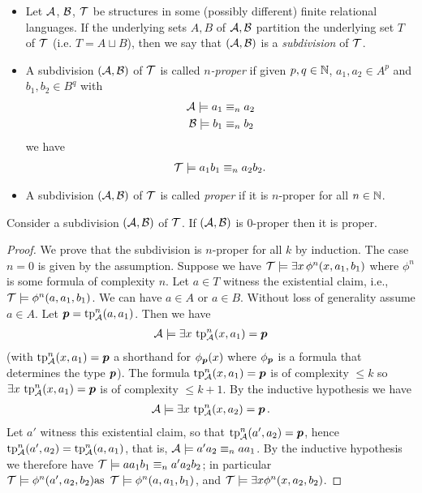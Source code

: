 \begin{Definition}
  \begin{itemize}
  \item Let $\mathcal A$, $\mathcal B$, $\operatorname{\mathcal T}$ be structures in some (possibly different) finite relational languages. If the underlying sets $A, B$ of $\mathcal A, \mathcal B$ partition the underlying set $T$ of $\operatorname{\mathcal T}$ (i.e. $T = A \sqcup B$), then we say that $(\mathcal A, \mathcal B)$ is a \emph{subdivision} of $\operatorname{\mathcal T}$.
  \item A subdivision $(\mathcal A, \mathcal B)$ of $\operatorname{\mathcal T}$ is called \emph{$n$-proper} if given $p,q \in \mathbb{N}$,  $a_1, a_2 \in A^p$ and $b_1, b_2 \in B^q$ with
    \begin{align*}
      \mathcal A \models a_1 &\equiv_n a_2 \\
      \mathcal B \models b_1 &\equiv_n b_2
    \end{align*}
    we have
    \begin{align*}
      \operatorname{\mathcal T} \models a_1b_1 \equiv_n a_2b_2.
    \end{align*}
  \item A subdivision $(\mathcal A, \mathcal B)$ of $\operatorname{\mathcal T}$ is called \emph{proper} if it is $n$-proper for all $n \in \mathbb{N}$.
  \end{itemize}
\end{Definition}

\begin{Lemma} \label{lm_subdivision}
  Consider a subdivision $(\mathcal A, \mathcal B)$ of $\operatorname{\mathcal T}$. If $(\mathcal A, \mathcal B)$ is $0$-proper then it is proper.
\end{Lemma}

\begin{proof}
  We prove that the subdivision is $n$-proper for all $k$ by induction.
  The case $n = 0$ is given by the assumption.
  Suppose we have $\operatorname{\mathcal T} \models \exists x \, \phi^n(x, a_1, b_1)$ where $\phi^n$ is some formula of complexity $n$. Let $a \in T$ witness the existential claim, i.e., $\operatorname{\mathcal T} \models \phi^n(a, a_1, b_1)$. We can have $a \in A$ or $a \in B$. Without loss of generality assume $a \in A$. Let $\operatorname{\boldsymbol p} = \operatorname{tp}^n_{\mathcal A} (a, a_1)$. Then we have 
  \begin{align*}
    \mathcal A \models \exists x \, \operatorname{tp}^n_{\mathcal A}(x, a_1) = \operatorname{\boldsymbol p}
  \end{align*}
  (with $\operatorname{tp}^n_{\mathcal A}(x, a_1) = \operatorname{\boldsymbol p}$ a shorthand for $\phi_{\operatorname{\boldsymbol p}}(x)$ where $\phi_{\operatorname{\boldsymbol p}}$ is a formula that determines the type $\operatorname{\boldsymbol p}$).
  The formula $\operatorname{tp}^n_{\mathcal A}(x, a_1) = \operatorname{\boldsymbol p}$ is of complexity $\leq k$ so $\exists x \, \operatorname{tp}^n_{\mathcal A}(x, a_1) = \operatorname{\boldsymbol p}$ is of complexity $\leq k+1$. By the inductive hypothesis we have
  \begin{align*}
    \mathcal A \models \exists x \, \operatorname{tp}^n_{\mathcal A}(x, a_2) = \operatorname{\boldsymbol p}.
  \end{align*}
  Let $a'$ witness this existential claim, so that $\operatorname{tp}^n_{\mathcal A}(a', a_2) = \operatorname{\boldsymbol p}$, hence $\operatorname{tp}^n_{\mathcal A}(a', a_2) = \operatorname{tp}^n_{\mathcal A}(a, a_1)$, that is,
  $\mathcal A \models a'a_2 \equiv_n aa_1$. By the inductive hypothesis we therefore have
  $\operatorname{\mathcal T} \models aa_1b_1 \equiv_n a'a_2b_2$; in particular $\operatorname{\mathcal T} \models \phi^n(a', a_2, b_2)  \text {as } \operatorname{\mathcal T} \models \phi^n(a, a_1, b_1)$,
  and $\operatorname{\mathcal T} \models \exists x \phi^n(x, a_2, b_2)$.
\end{proof}


